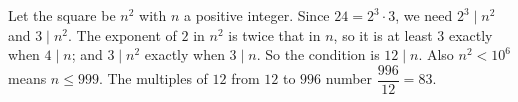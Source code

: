 Let the square be $n^2$ with $n$ a positive integer. Since $24=2^3\cdot3$, we need $2^3\mid n^2$ and $3\mid n^2$. The exponent of $2$ in $n^2$ is twice that in $n$, so it is at least $3$ exactly when $4\mid n$; and $3\mid n^2$ exactly when $3\mid n$. So the condition is $12\mid n$. Also $n^2<10^6$ means $n\le999$. The multiples of $12$ from $12$ to $996$ number $\dfrac{996}{12}=\boxed{83}$.
